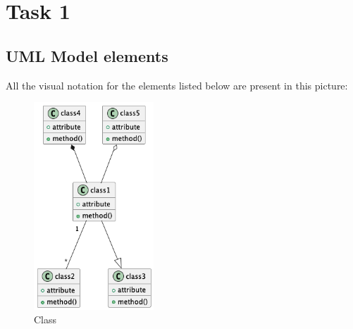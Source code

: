 \chapter{Task 1}
\section{UML Model elements}
All the visual notation for the elements listed below are present in this picture:
\begin{figure}[hbt]
\label{Class}
  \centering\includegraphics[width=0.4\textwidth]{Immagini/test-3.png}
  \caption{Class}
\end{figure}

